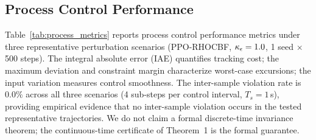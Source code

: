 \begin{table}[htbp]
    \centering
    \caption{HOCBF Violation Rate (\%) under Time-Varying Disturbances (mean $\pm$ std over 20 episodes $\times$ 300 steps). The NMPC+GP variant is a simplified cautious MPC (GP mean replacing EMA); it is not a full chance-constrained GP-MPC baseline.}
    \label{tab:timevarying_jpc}
    \footnotesize
\end{table}

\subsection{Process Control Performance}

Table~\ref{tab:process_metrics} reports process control performance metrics under three representative perturbation scenarios (PPO-RHOCBF, $\kappa_\epsilon = 1.0$, 1 seed $\times$ 500 steps). The integral absolute error (IAE) quantifies tracking cost; the maximum deviation and constraint margin characterize worst-case excursions; the input variation measures control smoothness. The inter-sample violation rate is $0.0\%$ across all three scenarios (4 sub-steps per control interval, $T_s = 1$\,s), providing empirical evidence that no inter-sample violation occurs in the tested representative trajectories. We do not claim a formal discrete-time invariance theorem; the continuous-time certificate of Theorem~1 is the formal guarantee.

